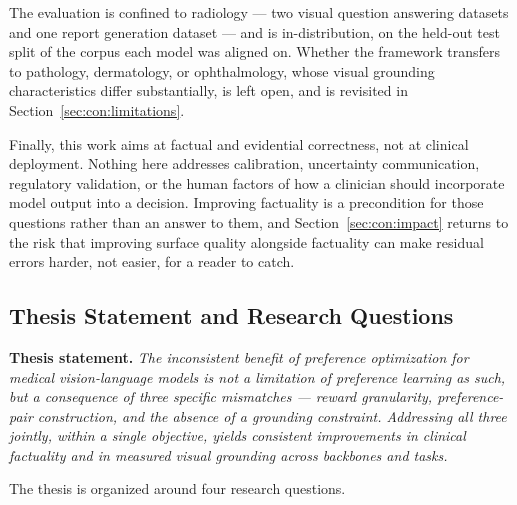The evaluation is confined to radiology --- two visual question answering datasets and one report generation dataset --- and is in-distribution, on the held-out test split of the corpus each model was aligned on. Whether the framework transfers to pathology, dermatology, or ophthalmology, whose visual grounding characteristics differ substantially, is left open, and is revisited in Section~\ref{sec:con:limitations}.

Finally, this work aims at factual and evidential correctness, not at clinical deployment. Nothing here addresses calibration, uncertainty communication, regulatory validation, or the human factors of how a clinician should incorporate model output into a decision. Improving factuality is a precondition for those questions rather than an answer to them, and Section~\ref{sec:con:impact} returns to the risk that improving surface quality alongside factuality can make residual errors harder, not easier, for a reader to catch.

\subsection{Thesis Statement and Research Questions}
\label{sec:intro:rqs}

\noindent\textbf{Thesis statement.} \emph{The inconsistent benefit of preference optimization for medical vision-language models is not a limitation of preference learning as such, but a consequence of three specific mismatches --- reward granularity, preference-pair construction, and the absence of a grounding constraint. Addressing all three jointly, within a single objective, yields consistent improvements in clinical factuality and in measured visual grounding across backbones and tasks.}

The thesis is organized around four research questions.

